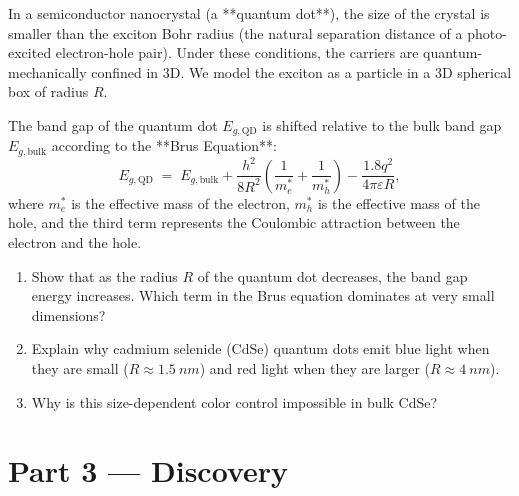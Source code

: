 \documentclass[12pt, a4paper]{book}
\begin{document}
\begin{problembox}
In a semiconductor nanocrystal (a **quantum dot**), the size of the crystal is smaller than the exciton Bohr radius (the natural separation distance of a photo-excited electron-hole pair). Under these conditions, the carriers are quantum-mechanically confined in 3D. We model the exciton as a particle in a 3D spherical box of radius $R$.

The band gap of the quantum dot $E_{g,\text{QD}}$ is shifted relative to the bulk band gap $E_{g,\text{bulk}}$ according to the **Brus Equation**:
\[
  E_{g,\text{QD}} \;=\; E_{g,\text{bulk}} + \frac{h^2}{8 R^2}\left(\frac{1}{m_e^*} + \frac{1}{m_h^*}\right) - \frac{1.8 q^2}{4\pi \varepsilon R},
\]
where $m_e^*$ is the effective mass of the electron, $m_h^*$ is the effective mass of the hole, and the third term represents the Coulombic attraction between the electron and the hole.

\begin{enumerate}[label=(\alph*)]
  \item Show that as the radius $R$ of the quantum dot decreases, the band gap energy increases. Which term in the Brus equation dominates at very small dimensions?
  \item Explain why cadmium selenide (CdSe) quantum dots emit blue light when they are small ($R \approx \SI{1.5}{nm}$) and red light when they are larger ($R \approx \SI{4}{nm}$).
  \item Why is this size-dependent color control impossible in bulk CdSe?
\end{enumerate}
\end{problembox}

\newpage

\section{Part 3 --- Discovery}
\end{document}
